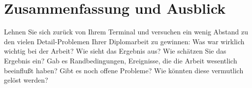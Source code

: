 \chapter{Zusammenfassung und Ausblick}\label{chp:zusammenfassung}
Lehnen Sie sich zurück von Ihrem Terminal und versuchen ein wenig Abstand zu den vielen Detail-Problemen Ihrer Diplomarbeit zu gewinnen:
Was war wirklich wichtig bei der Arbeit? 
Wie sieht das Ergebnis aus?
Wie schätzen Sie das Ergebnis ein?
Gab es Randbedingungen, Ereignisse, die die Arbeit wesentlich beeinflußt haben?
Gibt es noch offene Probleme?
Wie könnten diese vermutlich gelöst werden?